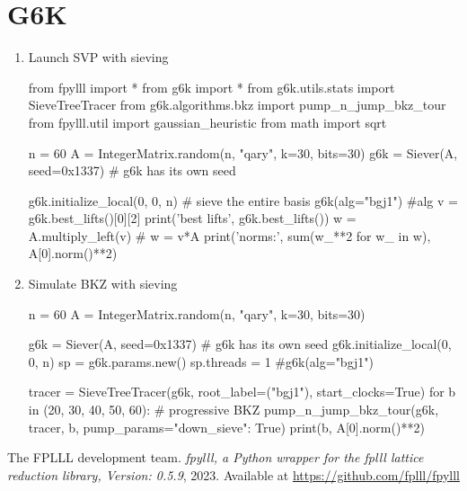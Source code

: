 \documentclass[11pt]{exam}
\theoremstyle{definition}
\begin{document}
\section{G6K}

\begin{enumerate}
	\item Launch SVP with sieving
	\begin{python}
		from fpylll import *
		from g6k import *
		from g6k.utils.stats import SieveTreeTracer
		from g6k.algorithms.bkz import pump_n_jump_bkz_tour
		from fpylll.util import gaussian_heuristic
		from math import sqrt

		n = 60
		A = IntegerMatrix.random(n, "qary", k=30, bits=30)
		g6k = Siever(A, seed=0x1337) # g6k has its own seed
		
		g6k.initialize_local(0, 0, n) # sieve the entire basis
		g6k(alg="bgj1") #alg 
		v = g6k.best_lifts()[0][2]
		print('best lifts', g6k.best_lifts())
		w = A.multiply_left(v)  # w = v*A
		print('norms:', sum(w_**2 for w_ in w), A[0].norm()**2)
	\end{python}
\item Simulate BKZ with sieving
\begin{python}
n = 60
A = IntegerMatrix.random(n, "qary", k=30, bits=30)

g6k = Siever(A, seed=0x1337) # g6k has its own seed
g6k.initialize_local(0, 0, n)
sp = g6k.params.new()
sp.threads = 1
#g6k(alg="bgj1")

tracer = SieveTreeTracer(g6k, root_label=("bgj1"), start_clocks=True)
for b in (20, 30, 40, 50, 60): # progressive BKZ
	pump_n_jump_bkz_tour(g6k, tracer, b, pump_params={"down_sieve": True})
print(b, A[0].norm()**2)
\end{python}
\end{enumerate}

\begin{thebibliography}{9}
	 The {FPLLL} development team.
	\textit{{fpylll}, a {Python} wrapper for the {fplll} lattice reduction library, {Version}: 0.5.9}, 2023. Available at \url{https://github.com/fplll/fpylll}
	
\end{thebibliography}
\end{document}
